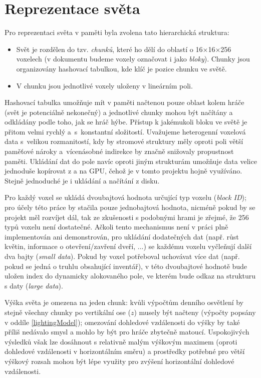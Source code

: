 \section{Reprezentace světa} \label{worldRepresentationDesign}
Pro reprezentaci světa v paměti byla zvolena tato hierarchická struktura:
\begin{itemize}
	\item Svět je rozdělen do tzv. \textit{chunků}, které ho dělí do oblastí o 16×16×256 voxelech (v dokumentu budeme voxely označovat i jako \textit{bloky}). Chunky jsou organizovány hashovací tabulkou, kde klíč je pozice chunku ve světě.
	\item V chunku jsou jednotlivé voxely uloženy v lineárním poli.
\end{itemize}

Hashovací tabulka umožňuje mít v paměti načtenou pouze oblast kolem hráče (svět je potenciálně nekonečný) a jednotlivé chunky mohou být načítány a odkládány podle toho, jak se hráč hýbe. Přístup k jakémukoli bloku ve světě je přitom velmi rychlý a~s~konstantní složitostí. Uvažujeme heterogenní voxelová data s~velikou rozmanitostí, kdy by stromové struktury měly oproti poli větší paměťové nároky a~vícenásobné indirekce by značně snižovaly propustnost paměti. Ukládání dat do pole navíc oproti jiným strukturám umožňuje data velice jednoduše kopírovat z a na GPU, čehož je v tomto projektu hojně využíváno. Stejně jednoduché je i ukládání a načítání z disku.

Pro každý voxel se ukládá dvoubajtová hodnota určující typ voxelu (\textit{block ID}); pro účely této práce by stačila pouze jednobajtová hodnota, nicméně pokud by se projekt měl rozvíjet dál, tak ze zkušenosti s podobnými hrami je zřejmé, že 256 typů voxelu není dostatečné. Ačkoli tento mechanismus není v práci plně implementován ani demonstrován, pro ukládání dodatečných dat (např. růst květin, informace o otevření/zavření dveří, ...) se každému voxelu vyčleňují další dva bajty (\textit{small data}). Pokud by voxel potřeboval uchovávat více dat (např. pokud se jedná o truhlu obsahující inventář), v této dvoubajtové hodnotě bude uložen index do dynamicky alokovaného pole, ve kterém bude odkaz na strukturu s daty (\textit{large data}).


Výška světa je omezena na jeden chunk: kvůli výpočtům denního osvětlení by stejně všechny chunky po vertikální ose ($z$) musely být načteny (výpočty popsány v oddíle \ref{lightingModel}); omezování dohledové vzdálenosti do výšky by také příliš nedávalo smysl a mohlo by být pro hráče zbytečně matoucí. Uspokojivých výsledků však lze dosáhnout s relativně malým výškovým maximem (oproti dohledové vzdálenosti v horizontálním směru) a prostředky potřebné pro větší výškový rozsah mohou být lépe využity pro zvýšení horizontální dohledové vzdálenosti. 

